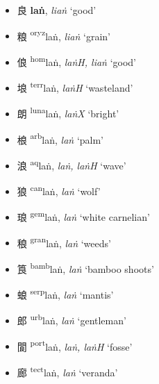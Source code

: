 \begin{itemize}
    \item {\Large{良}}  %
    {\large{\textbf{laṅ}}},
    \textit{liaṅ} `good' %

    \item {\Large{粮}}  %
    {\large{{\textsuperscript{oryz}}laṅ}},
    \textit{liaṅ} `grain' %

    \item {\Large{俍}}  %
    {\large{{\textsuperscript{hom}}laṅ}},
    \textit{laṅH, liaṅ} `good' %

    \item {\Large{埌}}  %
    {\large{{\textsuperscript{terr}}laṅ}},
    \textit{laṅH} `wasteland' %

    \item {\Large{朗}}  %
    {\large{{\textsuperscript{luna}}laṅ}},
    \textit{laṅX} `bright' %

    \item {\Large{桹}}  %
    {\large{{\textsuperscript{arb}}laṅ}},
    \textit{laṅ} `palm' %

    \item {\Large{浪}}  %
    {\large{{\textsuperscript{aq}}laṅ}},
    \textit{laṅ, laṅH} `wave' %

    \item {\Large{狼}}  %
    {\large{{\textsuperscript{can}}laṅ}},
    \textit{laṅ} `wolf' %

    \item {\Large{琅}}  %
    {\large{{\textsuperscript{gem}}laṅ}},
    \textit{laṅ} `white carnelian' %

    \item {\Large{稂}}  %
    {\large{{\textsuperscript{gran}}laṅ}},
    \textit{laṅ} `weeds' %

    \item {\Large{筤}}  %
    {\large{{\textsuperscript{bamb}}laṅ}},
    \textit{laṅ} `bamboo shoots' %

    \item {\Large{蜋}}  %
    {\large{{\textsuperscript{serp}}laṅ}},
    \textit{laṅ} `mantis' %

    \item {\Large{郎}}  %
    {\large{{\textsuperscript{urb}}laṅ}},
    \textit{laṅ} `gentleman' %

    \item {\Large{閬}}  %
    {\large{{\textsuperscript{port}}laṅ}},
    \textit{laṅ, laṅH} `fosse' %

    \item {\Large{廊}}  %
    {\large{{\textsuperscript{tect}}laṅ}},
    \textit{laṅ} `veranda' %
\end{itemize}

